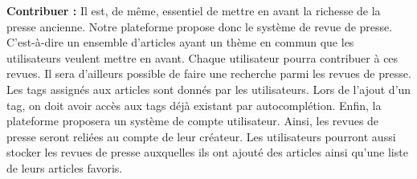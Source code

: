 	\textbf{Contribuer :} Il est, de même, essentiel de mettre en avant la richesse de la presse ancienne. Notre plateforme propose donc le système de revue de presse. C'est-à-dire un ensemble d'articles ayant un thème en commun que les utilisateurs veulent mettre en avant. Chaque utilisateur pourra contribuer à ces revues. Il sera d'ailleurs possible de faire une recherche parmi les revues de presse. Les tags assignés aux articles sont donnés par les utilisateurs. Lors de l'ajout d'un tag, on doit avoir accès aux tags déjà existant par autocomplétion. Enfin, la plateforme proposera un système de compte utilisateur. Ainsi, les revues de presse seront reliées au compte de leur créateur. Les utilisateurs pourront aussi stocker les revues de presse auxquelles ils ont ajouté des articles ainsi qu'une liste de leurs articles favoris.